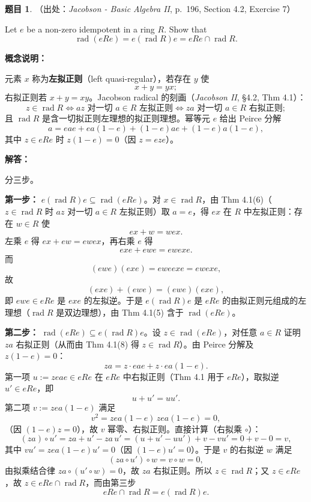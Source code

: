 \documentclass[a4paper]{ctexart}
\theoremstyle{definition}
\newtheorem{example}{题目}[section]
\theoremstyle{analysis}
\theoremstyle{plain}
\begin{document}
\begin{example}
（出处：\textit{Jacobson - Basic Algebra II}, p.~196, Section 4.2, Exercise 7）

Let \(e\) be a non-zero idempotent in a ring \(R\). Show that
\[
  \operatorname{rad}(eRe)=e(\operatorname{rad}R)e=eRe\cap\operatorname{rad}R.
\]

\textbf{概念说明：}

元素 \(x\) 称为\textbf{左拟正则}（left quasi-regular），若存在 \(y\) 使
\[
  x+y=yx;
\]
右拟正则若 \(x+y=xy\)。Jacobson radical 的刻画（\textit{Jacobson II}, \S 4.2, Thm 4.1）：
\[
  z\in\operatorname{rad}R
  \iff
  az\text{ 对一切 }a\in R\text{ 左拟正则}
  \iff
  za\text{ 对一切 }a\in R\text{ 右拟正则};
\]
且 \(\operatorname{rad}R\) 是含一切拟正则左理想的拟正则理想。幂等元 \(e\) 给出 Peirce 分解
\[
  a=eae+ea(1-e)+(1-e)ae+(1-e)a(1-e),
\]
其中 \(z\in eRe\) 时 \(z(1-e)=0\)（因 \(z=eze\)）。

\textbf{解答：}

分三步。

\medskip

\textbf{第一步：} \(e(\operatorname{rad}R)e\subseteq\operatorname{rad}(eRe)\)。对 \(x\in\operatorname{rad}R\)，由 Thm 4.1(6)（\(z\in\operatorname{rad}R\) 时 \(az\) 对一切 \(a\in R\) 左拟正则）取 \(a=e\)，得 \(ex\) 在 \(R\) 中左拟正则：存在 \(w\in R\) 使
\[
  ex+w=wex.
\]
左乘 \(e\) 得 \(ex+ew=ewex\)，再右乘 \(e\) 得
\[
  exe+ewe=ewexe.
\]
而
\[
  (ewe)(exe)=eweexe=ewexe,
\]
故
\[
  (exe)+(ewe)=(ewe)(exe),
\]
即 \(ewe\in eRe\) 是 \(exe\) 的左拟逆。于是 \(e(\operatorname{rad}R)e\) 是 \(eRe\) 的由拟正则元组成的左理想（\(\operatorname{rad}R\) 是双边理想），由 Thm 4.1(5) 含于 \(\operatorname{rad}(eRe)\)。

\medskip

\textbf{第二步：} \(\operatorname{rad}(eRe)\subseteq e(\operatorname{rad}R)e\)。设 \(z\in\operatorname{rad}(eRe)\)，对任意 \(a\in R\) 证明 \(za\) 右拟正则（从而由 Thm 4.1(8) 得 \(z\in\operatorname{rad}R\)）。由 Peirce 分解及 \(z(1-e)=0\)：
\[
  za=z\cdot eae+z\cdot ea(1-e).
\]
第一项 \(u:=zeae\in eRe\) 在 \(eRe\) 中右拟正则（Thm 4.1 用于 \(eRe\)），取拟逆 \(u'\in eRe\)，即
\[
  u+u'=uu'.
\]
第二项 \(v:=zea(1-e)\) 满足
\[
  v^2=zea(1-e)\,zea(1-e)=0,
\]
（因 \((1-e)z=0\)），故 \(v\) 幂零、右拟正则。直接计算（右拟乘 \(\circ\)）：
\[
  (za)\circ u'=za+u'-za\,u'=(u+u'-uu')+v-vu'=0+v-0=v,
\]
其中 \(vu'=zea(1-e)u'=0\)（因 \((1-e)u'=0\)）。于是 \(v\) 的右拟逆 \(w\) 满足
\[
  (za\circ u')\circ w=v\circ w=0,
\]
由拟乘结合律 \(za\circ(u'\circ w)=0\)，故 \(za\) 右拟正则。所以 \(z\in\operatorname{rad}R\)；又 \(z\in eRe\)，故 \(z\in eRe\cap\operatorname{rad}R\)，而由第三步
\[
  eRe\cap\operatorname{rad}R=e(\operatorname{rad}R)e.
\]


\end{example}
\end{document}
